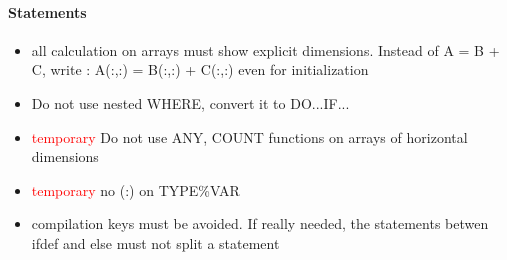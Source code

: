 \paragraph{Statements}
\begin{itemize}
    \item all calculation on arrays must show explicit dimensions. Instead of A = B + C, write : A(:,:) = B(:,:) + C(:,:) even for initialization
    \item Do not use nested WHERE, convert it to DO...IF...
    \item \textcolor{red}{temporary} Do not use ANY, COUNT functions on arrays of horizontal dimensions
     \item \textcolor{red}{temporary} no (:) on TYPE\%VAR
     \item compilation keys must be avoided. If really needed, the statements betwen ifdef and else must not split a statement
\end{itemize}